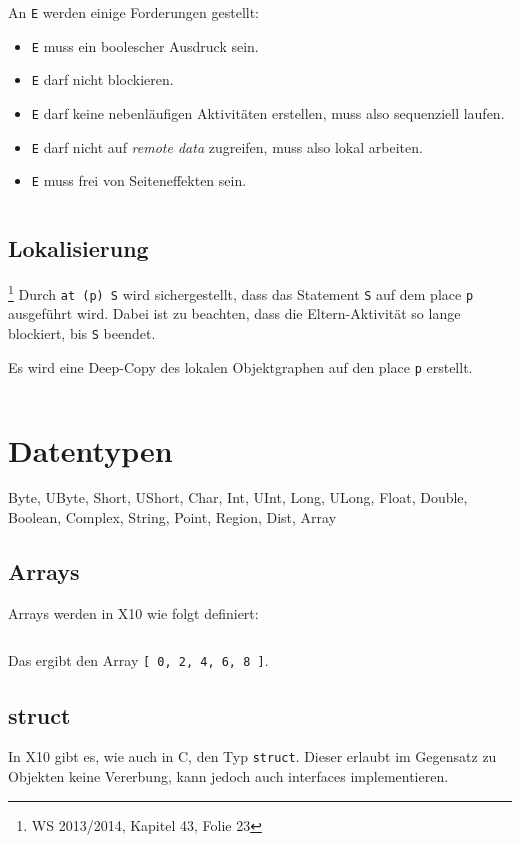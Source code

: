 An \texttt{E} werden einige Forderungen gestellt:

\begin{itemize}
    \item \texttt{E} muss ein boolescher Ausdruck sein.
    \item \texttt{E} darf nicht blockieren.
    \item \texttt{E} darf keine nebenläufigen Aktivitäten erstellen, muss also
          sequenziell laufen.
    \item \texttt{E} darf nicht auf \textit{remote data} zugreifen, muss also
          lokal arbeiten.
    \item \texttt{E} muss frei von Seiteneffekten sein.
\end{itemize}

\inputminted[numbersep=5pt, tabsize=4]{scala}{scripts/x10/when-example.x10}

\subsection{Lokalisierung}\footnote{WS 2013/2014, Kapitel 43, Folie 23}%
Durch \texttt{at (p) S} wird sichergestellt, dass das Statement \texttt{S} auf
dem place \texttt{p} ausgeführt wird. Dabei ist zu beachten, dass die Eltern-Aktivität
so lange blockiert, bis \texttt{S} beendet.

Es wird eine Deep-Copy des lokalen Objektgraphen auf den place \texttt{p} erstellt.

\inputminted[numbersep=5pt, tabsize=4]{scala}{scripts/x10/at-example.x10}

\section{Datentypen}
Byte, UByte, Short, UShort, Char, Int, UInt, Long, ULong, Float, Double, Boolean, 
Complex, String, Point, Region, Dist, Array

\subsection{Arrays}%
Arrays werden in X10 wie folgt definiert:

\inputminted[numbersep=5pt, tabsize=4]{scala}{scripts/x10/array-example.x10}

Das ergibt den Array \texttt{[ 0, 2, 4, 6, 8 ]}.

\subsection{struct}%
In X10 gibt es, wie auch in C, den Typ \texttt{struct}. Dieser erlaubt im Gegensatz
zu Objekten keine Vererbung, kann jedoch auch interfaces implementieren.

